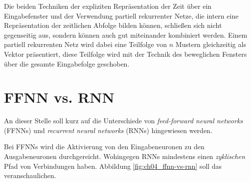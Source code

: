 Die beiden Techniken der expliziten Repräsentation der Zeit über ein Eingabefenster und der Verwendung partiell rekurrenter Netze, die intern eine Repräsentation der zeitlichen Abfolge bilden können, schließen sich nicht gegenseitig aus, sondern können auch gut miteinander kombiniert
werden.
Einem partiell rekurrenten Netz wird dabei eine Teilfolge von $n$
Mustern gleichzeitig als Vektor präsentiert, diese Teilfolge wird mit der Technik des beweglichen Fensters über die gesamte Eingabefolge geschoben.



\section*{FFNN vs. RNN}
An dieser Stelle soll kurz auf die Unterschiede von \emph{feed-forward neural networks} (FFNNs) und \emph{recurrent neural networks} (RNNs) hingewiesen werden.

Bei FFNNs wird die Aktivierung von den Eingabeneuronen zu den Ausgabeneuronen durchgereicht. Wohingegen RNNs mindestens einen \emph{zyklischen} Pfad von Verbindungen haben. Abbildung \ref{fig:ch04_ffnn-vs-rnn} soll das veranschaulichen.

